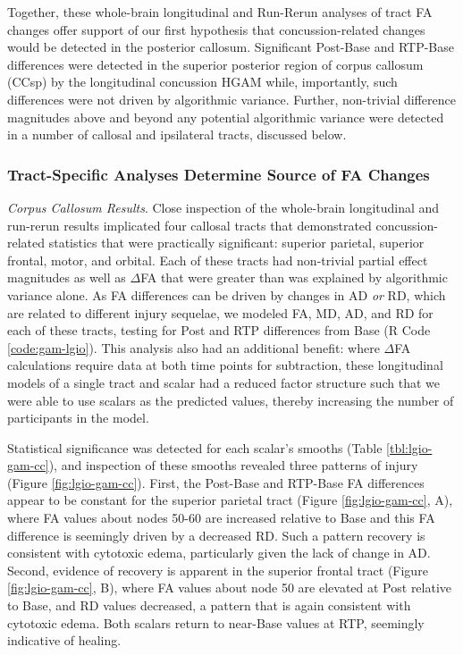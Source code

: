 \documentclass[12pt]{article}
\begin{document}
Together, these whole-brain longitudinal and Run-Rerun analyses of tract FA changes offer support of our first hypothesis that concussion-related changes would be detected in the posterior callosum. Significant Post-Base and RTP-Base differences were detected in the superior posterior region of corpus callosum (CCsp) by the longitudinal concussion HGAM while, importantly, such differences were not driven by algorithmic variance. Further, non-trivial difference magnitudes above and beyond any potential algorithmic variance were detected in a number of callosal and ipsilateral tracts, discussed below.


\subsubsection{Tract-Specific Analyses Determine Source of FA Changes}
\label{sssec:res-dwi-tract-tsa}
\textit{Corpus Callosum Results}. Close inspection of the whole-brain longitudinal and run-rerun results implicated four callosal tracts that demonstrated concussion-related statistics that were practically significant: superior parietal, superior frontal, motor, and orbital. Each of these tracts had non-trivial partial effect magnitudes as well as $\Delta$FA that were greater than was explained by algorithmic variance alone. As FA differences can be driven by changes in AD \textit{or} RD, which are related to different injury sequelae, we modeled FA, MD, AD, and RD for each of these tracts, testing for Post and RTP differences from Base (R Code \ref{code:gam-lgio}). This analysis also had an additional benefit: where $\Delta$FA calculations require data at both time points for subtraction, these longitudinal models of a single tract and scalar had a reduced factor structure such that we were able to use scalars as the predicted values, thereby increasing the number of participants in the model.

Statistical significance was detected for each scalar's smooths (Table \ref{tbl:lgio-gam-cc}), and inspection of these smooths revealed three patterns of injury (Figure \ref{fig:lgio-gam-cc}). First, the Post-Base and RTP-Base FA differences appear to be constant for the superior parietal tract (Figure \ref{fig:lgio-gam-cc}, A), where FA values about nodes 50-60 are increased relative to Base and this FA difference is seemingly driven by a decreased RD. Such a pattern recovery is consistent with cytotoxic edema, particularly given the lack of change in AD. Second, evidence of recovery is apparent in the superior frontal tract (Figure \ref{fig:lgio-gam-cc}, B), where FA values about node 50 are elevated at Post relative to Base, and RD values decreased, a pattern that is again consistent with cytotoxic edema. Both scalars return to near-Base values at RTP, seemingly indicative of healing.
\end{document}
